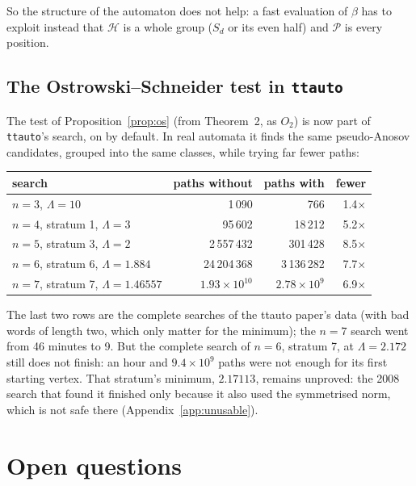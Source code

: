 \documentclass[11pt]{amsart}
\newcommand{\ttauto}{\texttt{ttauto}}
\newcommand{\Lam}{\Lambda}
\newcommand{\Pos}{\mathcal{P}}
\newcommand{\Hgp}{\mathcal{H}}
\theoremstyle{plain}
\theoremstyle{definition}
\begin{document}
So the structure of the automaton does not help: a fast evaluation of
$\beta$ has to exploit instead that $\Hgp$ is a whole group ($S_d$ or its
even half) and $\Pos$ is every position.

\subsection{The Ostrowski--Schneider test in \texorpdfstring{\ttauto}{ttauto}}
\label{sec:os-ttauto}

The test of Proposition~\ref{prop:os} (from Theorem~2, as $O_2$) is now
part of \ttauto's search, on by default.  In real automata it finds the
same pseudo-Anosov candidates, grouped into the same classes, while
trying far fewer paths:
\begin{center}
  \small
  \begin{tabular}{lrrr}
    \toprule
    search & paths without & paths with & fewer \\
    \midrule
    $n=3$, $\Lam=10$ & 1\,090 & 766 & 1.4$\times$ \\
    $n=4$, stratum 1, $\Lam=3$ & 95\,602 & 18\,212 & 5.2$\times$ \\
    $n=5$, stratum 3, $\Lam=2$ & 2\,557\,432 & 301\,428 & 8.5$\times$ \\
    $n=6$, stratum 6, $\Lam=1.884$ & 24\,204\,368 & 3\,136\,282 & 7.7$\times$ \\
    $n=7$, stratum 7, $\Lam=1.46557$ & $1.93\times10^{10}$ &
      $2.78\times10^9$ & 6.9$\times$ \\
    \bottomrule
  \end{tabular}
\end{center}
The last two rows are the complete searches of the ttauto paper's data
(with bad words of length two, which only matter for the minimum); the
$n=7$ search went from 46 minutes to 9.  But the complete search of
$n=6$, stratum 7, at $\Lam=2.172$ still does not finish: an hour and
$9.4\times10^9$ paths were not enough for its first starting vertex.  That
stratum's minimum, $2.17113$, remains unproved: the 2008 search that found
it finished only because it also used the symmetrised norm, which is not
safe there (Appendix~\ref{app:unusable}).

\section{Open questions}
\label{sec:open}
\end{document}
